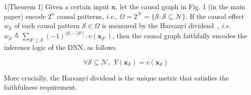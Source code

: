 \begin{manualtheorem}{1}[Theorem 1]\label{th:app-harsanyi-faithful}
Given a certain input {\small$\boldsymbol{x}$}, let the causal graph in Fig. 1 (in the main paper) encode {\small$2^n$} causal patterns, \emph{i.e.}, {\small$\Omega=2^{\mathcal{N}}=\{\mathcal{S}: \mathcal{S}\subseteq\mathcal{N}\}$}.
If the causal effect {\small$w_{\mathcal{S}}$} of each causal pattern {\small$\mathcal{S}\in\Omega$} is measured by the Harsanyi dividend~\cite{harsanyi1963simplified}, \emph{i.e.} {\small$w_{\mathcal{S}} \triangleq {\sum}_{\mathcal{S}'\subseteq \mathcal{S}}(-1)^{|\mathcal{S}|-|\mathcal{S}'|}\cdot v(\boldsymbol{x}_{\mathcal{S}'})$}, then the causal graph faithfully encodes the inference logic of the DNN, as follows.


\vspace{-5pt}
\begin{small}
\begin{equation}
    \forall \mathcal{S}\subseteq \mathcal{N},\ \ 
    Y(\boldsymbol{x}_{\mathcal{S}}) = v(\boldsymbol{x}_{\mathcal{S}})
\end{equation}
\end{small}
More crucially, the Harsanyi dividend is the unique metric that satisfies the faithfulness requirement.
\end{manualtheorem}
